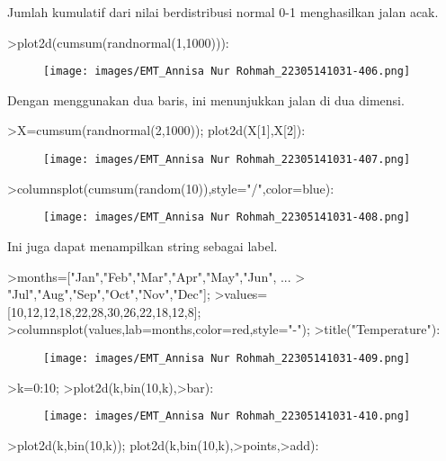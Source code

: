 \documentclass[a4paper,10pt]{article}
\begin{document}
\begin{eulernotebook}
\begin{eulercomment}
Jumlah kumulatif dari nilai berdistribusi normal 0-1 menghasilkan
jalan acak.
\end{eulercomment}
\begin{eulerprompt}
>plot2d(cumsum(randnormal(1,1000))):
\end{eulerprompt}
\begin{figure}[h]
    \centering
    \texttt{[image: images/EMT\_Annisa Nur Rohmah\_22305141031-406.png]}
\end{figure}
\begin{eulercomment}
Dengan menggunakan dua baris, ini menunjukkan jalan di dua dimensi.
\end{eulercomment}
\begin{eulerprompt}
>X=cumsum(randnormal(2,1000)); plot2d(X[1],X[2]):
\end{eulerprompt}
\begin{figure}[h]
    \centering
    \texttt{[image: images/EMT\_Annisa Nur Rohmah\_22305141031-407.png]}
\end{figure}
\begin{eulerprompt}
>columnsplot(cumsum(random(10)),style="/",color=blue):
\end{eulerprompt}
\begin{figure}[h]
    \centering
    \texttt{[image: images/EMT\_Annisa Nur Rohmah\_22305141031-408.png]}
\end{figure}
\begin{eulercomment}
Ini juga dapat menampilkan string sebagai label.
\end{eulercomment}
\begin{eulerprompt}
>months=["Jan","Feb","Mar","Apr","May","Jun", ...
>  "Jul","Aug","Sep","Oct","Nov","Dec"];
>values=[10,12,12,18,22,28,30,26,22,18,12,8];
>columnsplot(values,lab=months,color=red,style="-");
>title("Temperature"):
\end{eulerprompt}
\begin{figure}[h]
    \centering
    \texttt{[image: images/EMT\_Annisa Nur Rohmah\_22305141031-409.png]}
\end{figure}
\begin{eulerprompt}
>k=0:10;
>plot2d(k,bin(10,k),>bar):
\end{eulerprompt}
\begin{figure}[h]
    \centering
    \texttt{[image: images/EMT\_Annisa Nur Rohmah\_22305141031-410.png]}
\end{figure}
\begin{eulerprompt}
>plot2d(k,bin(10,k)); plot2d(k,bin(10,k),>points,>add):
\end{eulerprompt}

\end{eulernotebook}
\end{document}
